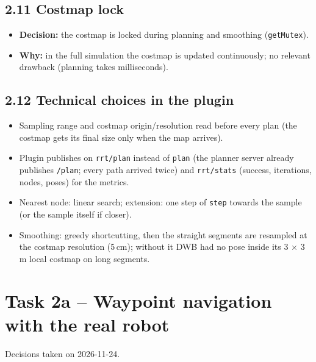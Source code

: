 \documentclass[10pt]{article}
\newcommand{\pkg}[1]{\texttt{#1}}
\begin{document}
\subsection*{2.11 Costmap lock}
\begin{itemize}
  \item \textbf{Decision:} the costmap is locked during planning and smoothing (\pkg{getMutex}).
  \item \textbf{Why:} in the full simulation the costmap is updated continuously; no relevant drawback (planning takes milliseconds).
\end{itemize}

\subsection*{2.12 Technical choices in the plugin}
\begin{itemize}
  \item Sampling range and costmap origin/resolution read before every plan (the costmap gets its final size only when the map arrives).
  \item Plugin publishes on \pkg{rrt/plan} instead of \pkg{plan} (the planner server already publishes \pkg{/plan}; every path arrived twice) and \pkg{rrt/stats} (success, iterations, nodes, poses) for the metrics.
  \item Nearest node: linear search; extension: one step of \pkg{step} towards the sample (or the sample itself if closer).
  \item Smoothing: greedy shortcutting, then the straight segments are resampled at the costmap resolution (5\,cm); without it DWB had no pose inside its 3 $\times$ 3\,m local costmap on long segments.
\end{itemize}

\section{Task 2a -- Waypoint navigation with the real robot}

Decisions taken on 2026-11-24.
\end{document}
